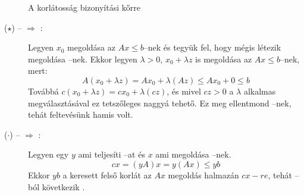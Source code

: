 \begin{figure}[htbp]
\caption{A korlátosság bizonyítási kőrre}
\label{fig:KorBizKor}
\centering {} 
\end{figure}            
\begin{description}
  \item[($\star$) --  $\Rightarrow$ :]  Legyen $x_0$
  megoldása az $Ax \leq b$--nek és tegyük fel, hogy mégis létezik megoldása
  --nek. Ekkor legyen $\lambda > 0$, $x_0 + \lambda z$ is megoldása
  az $Ax \leq b$--nek, mert:
  \[ A(x_0+ \lambda z) = Ax_0 + \lambda (Az) \leq A x_0 + 0 \leq b \] Továbbá
  $c(x_0 + \lambda z ) = c x_0 + \lambda (cz)$, és mivel $cz>0$ a $\lambda$
  alkalmas megválasztásával ez tetszőleges naggyá tehető. Ez meg ellentmond
  --nek, tehát feltevésünk hamis volt.
  \item[($\cdot$) --  $\Rightarrow$ :]  Legyen egy $y$
  ami teljesíti --at és $x$ ami megoldása --nek. 
  \[ cx = (yA)x = y(Ax) \leq yb \]
  Ekkor $yb$ a keresett felső korlát az $Ax$ megoldás halmazán $cx-re$, tehát
  --ból következik .
\end{description}